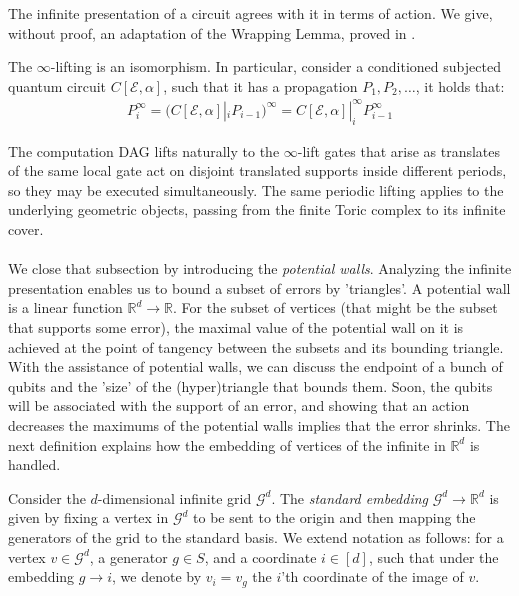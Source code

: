 The infinite presentation of a circuit agrees with it in terms of action. We give, without proof, an adaptation of the Wrapping Lemma, proved in \cite{schumacher2004reversiblequantumcellularautomata}.
\begin{claim}
The $\infty$-lifting is an isomorphism. In particular, consider a conditioned subjected quantum circuit $C[\mathcal{E},\alpha]$, such that it has a propagation $P_{1},P_{2},\ldots$, it holds that:
  \begin{equation*}
    \begin{split}
    P_{i}^{\infty} =  (C[\mathcal{E},\alpha]|_{ i} P_{i-1})^{\infty} =   C[\mathcal{E},\alpha]|_{ i}^{\infty} P_{i-1}^{\infty} 
    \end{split}
  \end{equation*}
\end{claim}



The computation DAG lifts naturally to the $\infty$-lift gates that arise as translates of the same local gate act on disjoint translated supports inside different periods, so they may be executed simultaneously. The same periodic lifting applies to the underlying geometric objects, passing from the finite Toric complex to its infinite cover.

\paragraph{}
We close that subsection by introducing the \textit{potential walls}. Analyzing the infinite presentation enables us to bound a subset of errors by 'triangles'. A potential wall is a linear function $\mathbb{R}^{d} \rightarrow \mathbb{R}$. For the subset of vertices (that might be the subset that supports some error), the maximal value of the potential wall on it is achieved at the point of tangency between the subsets and its bounding triangle. With the assistance of potential walls, we can discuss the endpoint of a bunch of qubits and the 'size' of the (hyper)triangle that bounds them. Soon, the qubits will be associated with the support of an error, and showing that an action decreases the maximums of the potential walls implies that the error shrinks. 
The next definition explains how the embedding of vertices of the infinite in $\mathbb{R}^{d}$ is handled.
\begin{definition}
  Consider the $d$-dimensional infinite grid $\mathcal{G}^{d}$. The \textit{standard embedding} $\mathcal{G}^{d} \rightarrow \mathbb{R}^{d}$ is given by fixing a vertex in $\mathcal{G}^{d}$ to be sent to the origin and then mapping the generators of the grid to the standard basis. We extend notation as follows: for a vertex $v \in \mathcal{G}^{d}$, a generator $g \in S$, and a coordinate $i \in [d]$, such that under the embedding $g \rightarrow i$, we denote by $v_{i} = v_{g}$ the $i$'th coordinate of the image of $v$.
\end{definition}

